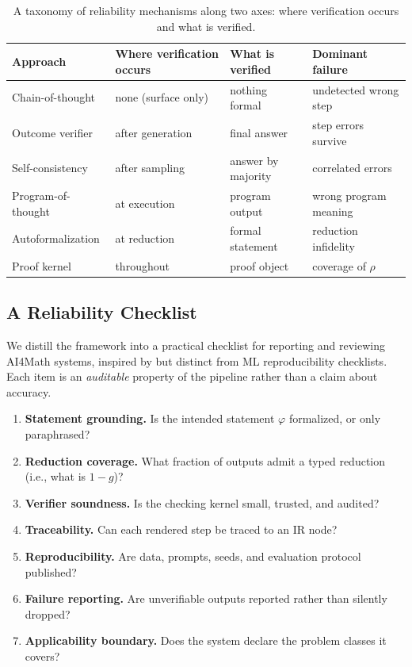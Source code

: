 \documentclass[11pt]{article}
\theoremstyle{definition}
\theoremstyle{plain}
\theoremstyle{remark}
\begin{document}
\begin{table}[t]
\centering
\small
\begin{tabular}{@{}l l l l@{}}
\toprule
\textbf{Approach} & \textbf{Where verification occurs} & \textbf{What is verified} & \textbf{Dominant failure}\\
\midrule
Chain-of-thought \cite{wei2022} & none (surface only) & nothing formal & undetected wrong step\\
Outcome verifier \cite{cobbe2021} & after generation & final answer & step errors survive\\
Self-consistency \cite{wang2023selfconsistency} & after sampling & answer by majority & correlated errors\\
Program-of-thought \cite{gao2023pal} & at execution & program output & wrong program meaning\\
Autoformalization \cite{wu2022} & at reduction & formal statement & reduction infidelity\\
Proof kernel \cite{demoura2021,hubert2025} & throughout & proof object & coverage of $\rho$\\
\bottomrule
\end{tabular}
\caption{A taxonomy of reliability mechanisms along two axes: where verification occurs and
what is verified.}
\label{tab:taxonomy}
\end{table}

\subsection{A Reliability Checklist}
We distill the framework into a practical checklist for reporting and reviewing AI4Math
systems, inspired by but distinct from ML reproducibility checklists. Each item is an
\emph{auditable} property of the pipeline rather than a claim about accuracy.
\begin{enumerate}[leftmargin=1.5em]
  \item \textbf{Statement grounding.} Is the intended statement $\varphi$ formalized, or only
        paraphrased?
  \item \textbf{Reduction coverage.} What fraction of outputs admit a typed reduction (i.e.,
        what is $1-g$)?
  \item \textbf{Verifier soundness.} Is the checking kernel small, trusted, and audited?
  \item \textbf{Traceability.} Can each rendered step be traced to an IR node?
  \item \textbf{Reproducibility.} Are data, prompts, seeds, and evaluation protocol published?
  \item \textbf{Failure reporting.} Are unverifiable outputs reported rather than silently
        dropped?
  \item \textbf{Applicability boundary.} Does the system declare the problem classes it covers?
\end{enumerate}
\end{document}
